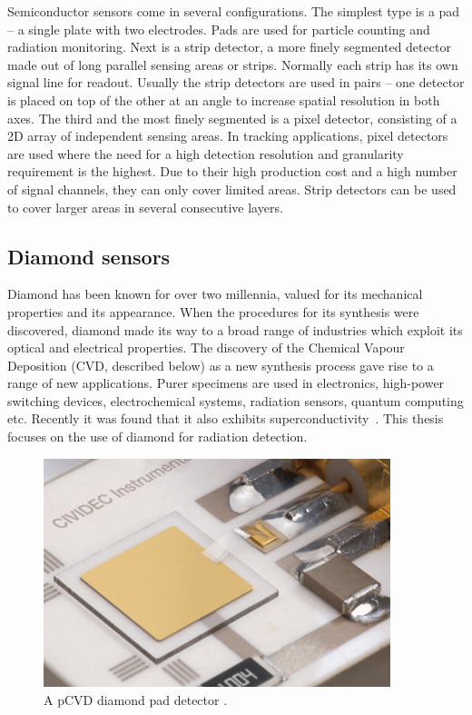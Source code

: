 Semiconductor sensors come in several configurations. The simplest type is a pad -- a single plate with two electrodes. Pads are used for particle counting and radiation monitoring. Next is a strip detector, a more finely segmented detector made out of long parallel sensing areas or strips. Normally each strip has its own signal line for readout. Usually the strip detectors are used in pairs -- one detector is placed on top of the other at an angle to increase spatial resolution in both axes. The third and the most finely segmented is a pixel detector, consisting of a 2D array of independent sensing areas. In tracking applications, pixel detectors are used where the need for a high detection resolution and granularity requirement is the highest. Due to their high production cost and a high number of signal channels, they can only cover limited areas. Strip detectors can be used to cover larger areas in several consecutive layers.

\subsection{Diamond sensors}
Diamond has been known for over two millennia, valued for its mechanical properties and its appearance. When the procedures for its synthesis were discovered, diamond made its way to a broad range of industries which exploit its optical and electrical properties. The discovery of the Chemical Vapour Deposition (CVD, described below) as a new synthesis process gave rise to a range of new applications. Purer specimens are used in electronics, high-power switching devices, electrochemical systems, radiation sensors, quantum computing etc. Recently it was found that it also exhibits superconductivity~\cite{}. This thesis focuses on the use of diamond for radiation detection.
\begin{figure}[!t]
\centering
\includegraphics[width=0.9\textwidth]{01_introduction/pics/cividecpcvd}
\caption{A pCVD diamond pad detector \cite{Cividec:00000}.}
\label{fig:cividecpcvd}
\end{figure}

